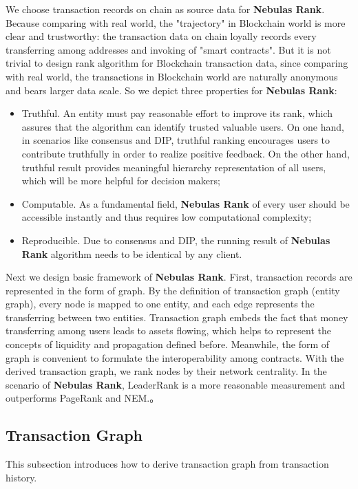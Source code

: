 We choose transaction records on chain as source data for \textbf{Nebulas Rank}. Because comparing with real world, the "trajectory" in Blockchain world is more clear and trustworthy: the transaction data on chain loyally records every transferring among addresses and invoking of "smart contracts". But it is not trivial to design rank algorithm for Blockchain transaction data, since comparing with real world, the transactions in Blockchain world are naturally anonymous and bears larger data scale. So we depict three properties for \textbf{Nebulas Rank}:
\begin{itemize}
	\item Truthful. An entity must pay reasonable effort to improve its rank, which assures that the algorithm can identify trusted valuable users. On one hand, in scenarios like consensus and DIP, truthful ranking encourages users to contribute truthfully in order to realize positive feedback. On the other hand, truthful result provides meaningful hierarchy representation of all users, which will be more helpful for decision makers;
	\item Computable. As a fundamental field, \textbf{Nebulas Rank} of every user should be accessible instantly and thus requires low computational complexity;  
	\item Reproducible. Due to consensus and DIP, the running result of \textbf{Nebulas Rank} algorithm needs to be identical by any client.
\end{itemize}

Next we design basic framework of \textbf{Nebulas Rank}. First, transaction records are represented in the form of graph. By the definition of transaction graph (entity graph), every node is mapped to one entity, and each edge represents the transferring between two entities\cite{Tschorsch2015}. Transaction graph embeds the fact that money transferring among users leads to assets flowing, which helps to represent the concepts of liquidity and propagation defined before. Meanwhile, the form of graph is convenient to formulate the interoperability among contracts. With the derived transaction graph, we rank nodes by their network centrality. In the scenario of \textbf{Nebulas Rank}, LeaderRank\cite{Chen2013}\cite{Li2014} is a more reasonable measurement and outperforms PageRank and NEM\cite{nem}.。

\subsection{Transaction Graph} \label{subsec:txg}
This subsection introduces how to derive transaction graph from transaction history.

